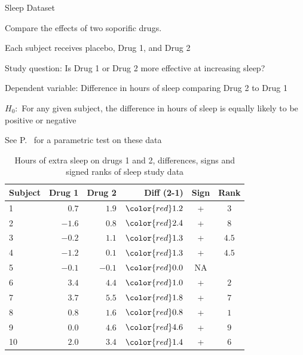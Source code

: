 \bi
\item Sleep Dataset
\bi
\item Compare the effects of two soporific drugs.
\item Each subject receives placebo, Drug 1, and Drug 2
\item Study question: Is Drug 1 or Drug 2 more effective at increasing sleep?
\item Dependent variable: Difference in hours of sleep comparing Drug 2 to Drug 1
\item $H_0:$ For any given subject, the difference in hours of sleep is equally likely to be positive or negative
\item See P.~\pageref{sleeppaired} for a parametric test on these data
\ei
\ei
\begin{table}[!hbp]
 \begin{center}
 \begin{tabular}{lrrrcc}\hline\hline
Subject & Drug 1 & Drug 2 & \color{red}Diff (2-1) & Sign & Rank \\ \hline
1  &$ 0.7$&$ 1.9$&$\color{red}1.2$&+&$3$\\
2  &$-1.6$&$ 0.8$&$\color{red}2.4$&+&$8$\\
3  &$-0.2$&$ 1.1$&$\color{red}1.3$&+&$4.5$\\
4  &$-1.2$&$ 0.1$&$\color{red}1.3$&+&$4.5$\\
5  &$-0.1$&$-0.1$&$\color{red}0.0$&NA&\\
6  &$ 3.4$&$ 4.4$&$\color{red}1.0$&+&$2$\\
7  &$ 3.7$&$ 5.5$&$\color{red}1.8$&+&$7$\\
8  &$ 0.8$&$ 1.6$&$\color{red}0.8$&+&$1$\\
9  &$ 0.0$&$ 4.6$&$\color{red}4.6$&+&$9$\\
10 &$ 2.0$&$ 3.4$&$\color{red}1.4$&+&$6$\\
\hline
\end{tabular}
\caption{Hours of extra sleep on drugs 1 and 2, differences, signs and
  signed ranks of sleep study data}
\end{center}
\end{table}
